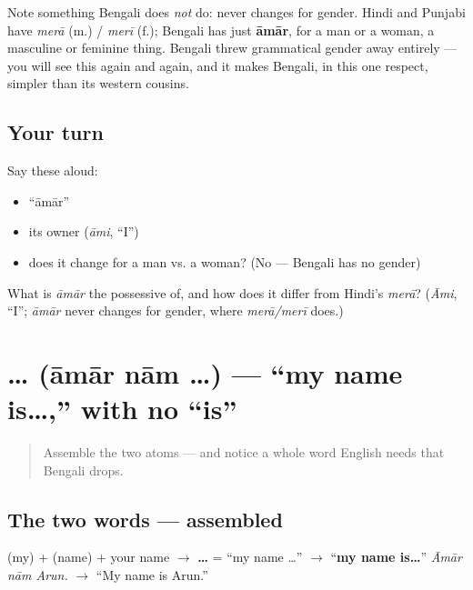 \begin{grammarlens}[title={Grammar Lens: no gender here}]
Note something Bengali does \emph{not} do: \textbf{} never changes for gender. Hindi and Punjabi have \emph{merā} (m.) / \emph{merī} (f.); Bengali has just \textbf{āmār}, for a man or a woman, a masculine or feminine thing. Bengali threw grammatical gender away entirely — you will see this again and again, and it makes Bengali, in this one respect, simpler than its western cousins.
\end{grammarlens}

\subsection*{Your turn}
Say these aloud:

\begin{itemize}
\raggedright
  \item \textquotedblleft{}āmār\textquotedblright{}
  \item its owner (\emph{āmi}, \textquotedblleft{}I\textquotedblright{})
  \item does it change for a man vs. a woman? (No — Bengali has no gender)
\end{itemize}

\begin{tcolorbox}[breakable,colback=teal!4,colframe=teal!35!black,title={Before you move on}]
What is \emph{āmār} the possessive of, and how does it differ from Hindi's \emph{merā}? (\emph{Āmi}, \textquotedblleft{}I\textquotedblright{}; \emph{āmār} never changes for gender, where \emph{merā/merī} does.)
\end{tcolorbox}
\section[\bn{আমার} \bn{নাম} …]{  … (āmār nām …) — \textquotedblleft{}my name is…,\textquotedblright{} with no \textquotedblleft{}is\textquotedblright{}}

\label{lesson:BN-C02-amar-naam}



\begin{quote}
Assemble the two atoms — and notice a whole word English needs that Bengali drops.
\end{quote}

\subsection*{The two words — assembled}
\textbf{} (my) + \textbf{} (name) + your name $\to$ \textbf{  …} = \textquotedblleft{}my name …\textquotedblright{} $\to$ \textquotedblleft{}\textbf{my name is…}\textquotedblright{} \emph{Āmār nām Arun.} $\to$ \textquotedblleft{}My name is Arun.\textquotedblright{}

